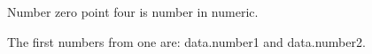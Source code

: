\documentclass{article}
\begin{document}
Number zero point four is {{number}} in numeric.

The first numbers from one are: {{data.number1}} and {{data.number2}}.
\end{document}

